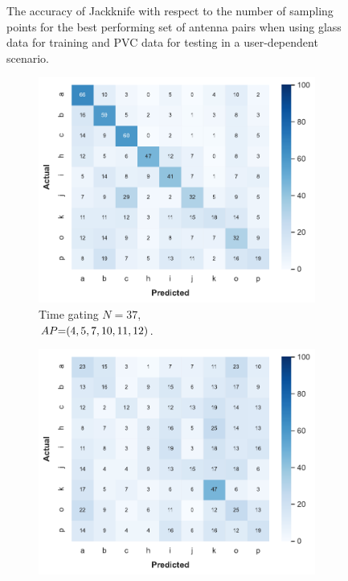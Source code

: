 \begin{figure}[ht]
  \vspace{-6pt}
  \caption{The accuracy of Jackknife with respect to the number of sampling points for the best performing set of antenna pairs when using glass data for training and PVC data for testing in a user-dependent scenario.}
  \label{fig:radar-experiments:through-materials:glass-pvc-samples}
\end{figure}

\begin{figure}[ht]
  \begin{subfigure}{.49\textwidth}
      \centering
      \includegraphics[width=.99\linewidth]{Figures/RadarExperiments/Datasets/ThroughMaterials/Glass+PVC/confusion-timegating-ud.pdf}
      \vspace{-15pt}
      \captionsetup{width=.99\linewidth}
      \caption{Time gating $N{=}37$, \\ $\splitatcommas{AP{=}(4, 5, 7, 10, 11, 12)}$.}
      \label{fig:radar-experiments:through-materials:glass-pvc-confusion:timegating-ud}
  \end{subfigure}
  \begin{subfigure}{.49\textwidth}
      \centering
      \includegraphics[width=.99\linewidth]{Figures/RadarExperiments/Datasets/ThroughMaterials/Glass+PVC/confusion-filtering-ud.pdf}

\end{subfigure}
\end{figure}
